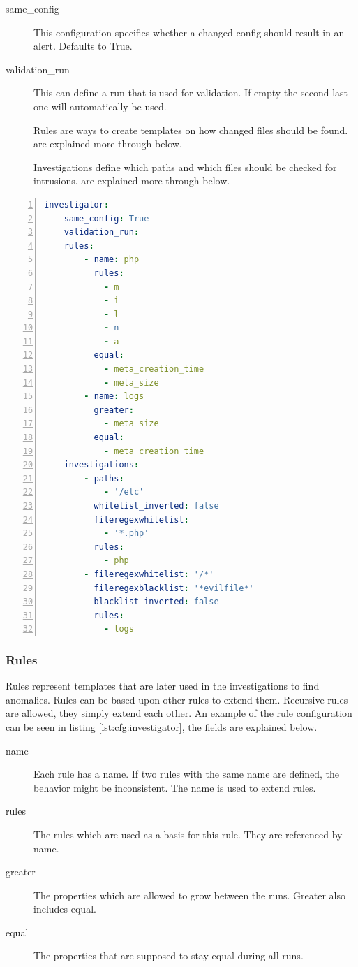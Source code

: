 \begin{description}
    \item [same\_config] This configuration specifies whether a changed config should result in an alert. Defaults to True.
    \item [validation\_run] This can define a run that is used for validation. If empty the second last one will automatically be used.
    \item [] Rules are ways to create templates on how changed files should be found.  are explained more through below.
    \item [] Investigations define which paths and which files should be checked for \glspl{intrusion}.  are explained more through below.
\end{description}

\begin{lstlisting}[language=yaml, numbers=left, caption=Investigator Configuration, label=lst:cfg:investigator]
investigator:
	same_config: True
	validation_run: 
	rules: 
		- name: php
		  rules: 
			- m
			- i
			- l
			- n
			- a
		  equal:
			- meta_creation_time
			- meta_size
		- name: logs
		  greater:
			- meta_size
		  equal:
			- meta_creation_time
	investigations:
		- paths:
			- '/etc'
		  whitelist_inverted: false
		  fileregexwhitelist:
			- '*.php'
		  rules:
			- php
		- fileregexwhitelist: '/*'
		  fileregexblacklist: '*evilfile*'
		  blacklist_inverted: false
		  rules:
			- logs
\end{lstlisting}

\subsubsection{Rules}
\label{sec:config:rules}

Rules represent templates that are later used in the investigations to find anomalies. Rules can be based upon other rules to extend them. Recursive rules are allowed, they simply extend each other. An example of the rule configuration can be seen in listing \ref{lst:cfg:investigator}, the fields are explained below.

\begin{description}
	\item [name] Each rule has a name. If two rules with the same name are defined, the behavior might be inconsistent. The name is used to extend rules.
	\item [rules] The rules which are used as a basis for this rule. They are referenced by name.
	\item [greater] The properties which are allowed to grow between the runs. Greater also includes equal.
	\item [equal] The properties that are supposed to stay equal during all runs.
\end{description}

